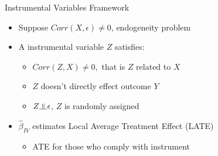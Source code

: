 \documentclass[compress]{beamer}
\newcommand{\indep}{\rotatebox[origin=c]{90}{$\models$}}
\begin{document}
\begin{frame}{Instrumental Variables Framework}

\begin{itemize}
\vspace*{-1.5cm}
\setlength\itemsep{2em}
\item Suppose $Corr(X, \epsilon) \ne 0$, endogeneity problem
\item A instrumental variable $Z$ satisfies:
\begin{itemize}
\setlength\itemsep{1em}
\item $Corr(Z,X) \ne 0,$ that is $Z$ related to $X$
\item $Z$ doesn't directly effect outcome $Y$
\item $Z \indep \epsilon$, $Z$ is randomly assigned 
\end{itemize}
\item $\widehat{\beta}_{IV}$ estimates Local Average Treatment Effect (LATE)
\begin{itemize}
\item ATE for those who comply with instrument
\end{itemize}
\end{itemize}

\end{frame}
\end{document}

